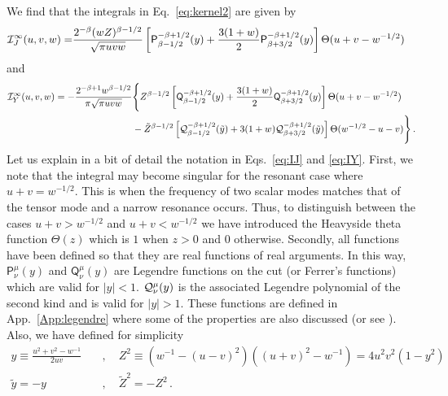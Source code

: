 \documentclass[aps,10pt,prd,groupedaddress,nofootinbib,notitlepage,eqsecnum,preprintnumbers]{revtex4-1}
\begin{document}
We find that the integrals in Eq.~\eqref{eq:kernel2} are given by
\begin{align}\label{eq:IJ}
{\cal I}^\infty_J(u,v,w)=&\frac{2^{-\beta}(wZ)^{\beta-1/2}}{\sqrt{\pi uvw}}\left[\mathsf{P}^{-\beta+1/2}_{\beta-1/2}(y)+\frac{3(1+w)}{2}\mathsf{P}^{-\beta+1/2}_{\beta+3/2}(y)\right]\Theta(u+v-w^{-1/2})
\end{align}
and
\begin{align}\label{eq:IY}
{\cal I}^\infty_Y(u,v,w)=-\frac{2^{-\beta+1}w^{\beta-1/2}}{\pi\sqrt{\pi uvw}}&\Bigg\{Z^{\beta-1/2}\left[
	\mathsf{Q}^{-\beta+1/2}_{\beta-1/2}(y)+\frac{3(1+w)}{2}\mathsf{Q}^{-\beta+1/2}_{\beta+3/2}(y)\right]\Theta(u+v-w^{-1/2})\\&
	-\tilde Z^{\beta-1/2}\left[{\cal Q}^{-\beta+1/2}_{\beta-1/2}(\tilde y)+3(1+w){\cal Q}^{-\beta+1/2}_{\beta+3/2}(\tilde y)\right]\Theta(w^{-1/2}-u-v)\Bigg\}\,.
\end{align}
Let us explain in a bit of detail the notation in Eqs.~\eqref{eq:IJ} and \eqref{eq:IY}. First, we note that the integral may become singular for the resonant case where $u+v=w^{-1/2}$. This is when the frequency of two scalar modes matches that of the tensor mode and a narrow resonance occurs. Thus, to distinguish between the cases $u+v>w^{-1/2}$ and $u+v<w^{-1/2}$ we have introduced the Heavyside theta function $\Theta(z)$ which is $1$ when $z>0$ and $0$ otherwise. Secondly, all functions have been defined so that they are real functions of real arguments. In this way, $\mathsf{P}^\mu_\nu(y)$ and $\mathsf{Q}^\mu_\nu(y)$ are Legendre functions on the cut (or Ferrer's functions) which are valid for $|y|<1$. ${\cal Q}^\mu_\nu(y)$ is the associated Legendre polynomial of the second kind and is valid for $|y|>1$. These functions are defined in App.~\ref{App:legendre} where some of the properties are also discussed (or see \cite{NIST:DLMF}). Also, we have defined for simplicity
\begin{align}
y\equiv\frac{u^2+v^2-w^{-1}}{2uv}\quad&,\quad Z^2\equiv \left(w^{-1}-(u-v)^2\right)\left((u+v)^2-w^{-1}\right)=4u^2v^2(1-y^2)\\
\tilde y=-y\quad&,\quad\tilde Z^2=-Z^2\,.
\end{align}
\end{document}
